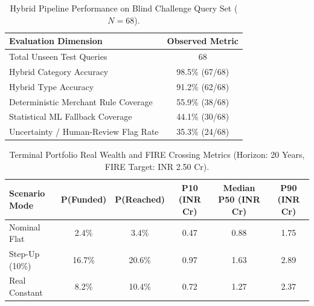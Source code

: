\begin{table}[t]
\centering
\caption{Hybrid Pipeline Performance on Blind Challenge Query Set ($N=68$).}
\label{tab:hybrid_blind}
\begin{tabular}{lc}
\hline
\textbf{Evaluation Dimension} & \textbf{Observed Metric} \\
\hline
Total Unseen Test Queries & 68 \\
Hybrid Category Accuracy & 98.5\% (67/68) \\
Hybrid Type Accuracy & 91.2\% (62/68) \\
Deterministic Merchant Rule Coverage & 55.9\% (38/68) \\
Statistical ML Fallback Coverage & 44.1\% (30/68) \\
Uncertainty / Human-Review Flag Rate & 35.3\% (24/68) \\
\hline
\end{tabular}
\end{table}

\begin{table}[t]
\centering
\caption{Terminal Portfolio Real Wealth and FIRE Crossing Metrics (Horizon: 20 Years, FIRE Target: INR 2.50 Cr).}
\label{tab:monte_carlo_scenarios}
\begin{tabular}{lccccc}
\hline
\textbf{Scenario Mode} & \textbf{P(Funded)} & \textbf{P(Reached)} & \textbf{P10 (INR Cr)} & \textbf{Median P50 (INR Cr)} & \textbf{P90 (INR Cr)} \\
\hline
Nominal Flat & 2.4\% & 3.4\% & 0.47 & 0.88 & 1.75 \\
Step-Up (10\%) & 16.7\% & 20.6\% & 0.97 & 1.63 & 2.89 \\
Real Constant & 8.2\% & 10.4\% & 0.72 & 1.27 & 2.37 \\
\hline
\end{tabular}
\end{table}

